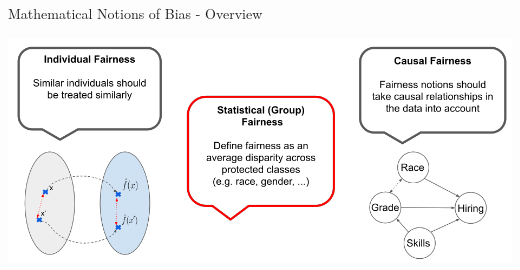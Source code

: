 \documentclass[11pt,compress,t,notes=noshow, xcolor=table]{beamer}
\begin{document}
\begin{vbframe}{Mathematical Notions of Bias - Overview}
    \begin{center}
        \vspace{.5cm}
        \includegraphics[width=\textwidth]{figures/fairness_definitions.png}
    \end{center}
\end{vbframe}
\end{document}
